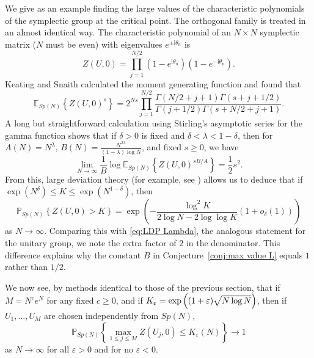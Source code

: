 \documentclass[10pt,reqno,twoside]{amsart}
\renewcommand{\i}{{\mathrm{i}}} %
\newcommand{\E}{\mathbb{E}}
\newcommand{\Prob}{\mathbb{P}}
\numberwithin{equation}{section}
\numberwithin{theorem}{section}
\begin{document}
{{We give as an example finding the large values of the characteristic
polynomials of the symplectic group at the critical point. The orthogonal
family is treated in an almost identical way. The characteristic
polynomial of an $N\times N$ symplectic matrix ($N$ must be even)
with eigenvalues $e^{\pm\i\theta_n}$ is
\begin{equation}
Z(U,0) = \prod_{j=1}^{N/2} (1-e^{\i\theta_n})(1-e^{-\i\theta_n}).
\end{equation}
Keating and Snaith \cite{KS2} calculated the moment generating
function and found that
\begin{equation}
\E_{Sp(N)}\left\{Z(U,0)^s \right\} = 2^{Ns} \prod_{j=1}^{N/2}
\frac{\Gamma(N/2+j+1) \Gamma(s+j+1/2)}{\Gamma(j+1/2)
\Gamma(s+N/2+j+1)}.
\end{equation}
A long but straightforward calculation using Stirling's asymptotic
series for the gamma function shows that if $\delta>0$ is fixed
and $\delta<\lambda<1-\delta$, then for $A(N) = N^{\lambda}$,
$B(N) = \frac{N^{2\lambda}}{(1-\lambda)\log N}$, and fixed $s \geq
0$, we have
\begin{equation}\label{eq:symplectic log gen func}
\lim_{N\to\infty} \frac{1}{B} \log \E_{Sp(N)}\left\{Z(U,0)^{s B /
A} \right\} = \frac{1}{2} s^2.
\end{equation}
{}From this, large deviation theory (for example, see \cite{DZ})
allows us to deduce that if
$\exp(N^\delta) \leq K \leq \exp(N^{1-\delta})$, then
\begin{equation}\label{eq:symplectic rate func}
\Prob_{Sp(N)}\left\{ Z(U,0) > K \right\} = \exp\left(-\frac{\log^2
K}{ 2\log N -2\log\log K} (1+o_\delta(1))\right)
\end{equation}
as $N\to\infty$. Comparing this with \eqref{eq:LDP Lambda}, the
analogous statement for the  unitary group, we note the extra
factor of $2$ in the denominator. This difference explains why the
constant $B$ in Conjecture~\ref{conj:max value L} equals $1$
rather than $1/2$.

We now see,  by  methods identical to those of the previous
section, that if $M=N^c e^{N}$ for any fixed $c\geq 0$, and if
$K_\varepsilon=\exp\left((1+\varepsilon)\sqrt{\mathstrut N \log
N}\right)$, then if $U_1,\dots, U_M$ are chosen independently from
$Sp(N)$,
\begin{equation}
\Prob_{Sp(N)}\left\{ \max_{1\leq j \leq M} Z(U_j,0) \leq
K_\varepsilon(N) \right\} \to 1
\end{equation}
as $N\to\infty$ for all $\varepsilon>0$ and for no
$\varepsilon<0$.

}}
\end{document}
